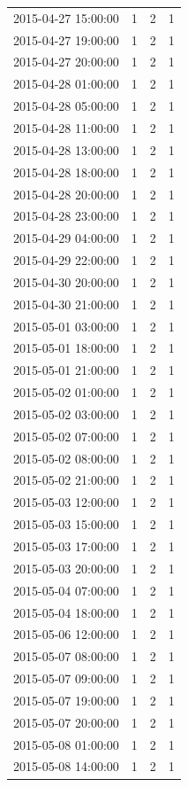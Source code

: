 \begin{tabular}{lrrr}
2015-04-27 15:00:00 & 1 & 2 & 1 \\
2015-04-27 19:00:00 & 1 & 2 & 1 \\
2015-04-27 20:00:00 & 1 & 2 & 1 \\
2015-04-28 01:00:00 & 1 & 2 & 1 \\
2015-04-28 05:00:00 & 1 & 2 & 1 \\
2015-04-28 11:00:00 & 1 & 2 & 1 \\
2015-04-28 13:00:00 & 1 & 2 & 1 \\
2015-04-28 18:00:00 & 1 & 2 & 1 \\
2015-04-28 20:00:00 & 1 & 2 & 1 \\
2015-04-28 23:00:00 & 1 & 2 & 1 \\
2015-04-29 04:00:00 & 1 & 2 & 1 \\
2015-04-29 22:00:00 & 1 & 2 & 1 \\
2015-04-30 20:00:00 & 1 & 2 & 1 \\
2015-04-30 21:00:00 & 1 & 2 & 1 \\
2015-05-01 03:00:00 & 1 & 2 & 1 \\
2015-05-01 18:00:00 & 1 & 2 & 1 \\
2015-05-01 21:00:00 & 1 & 2 & 1 \\
2015-05-02 01:00:00 & 1 & 2 & 1 \\
2015-05-02 03:00:00 & 1 & 2 & 1 \\
2015-05-02 07:00:00 & 1 & 2 & 1 \\
2015-05-02 08:00:00 & 1 & 2 & 1 \\
2015-05-02 21:00:00 & 1 & 2 & 1 \\
2015-05-03 12:00:00 & 1 & 2 & 1 \\
2015-05-03 15:00:00 & 1 & 2 & 1 \\
2015-05-03 17:00:00 & 1 & 2 & 1 \\
2015-05-03 20:00:00 & 1 & 2 & 1 \\
2015-05-04 07:00:00 & 1 & 2 & 1 \\
2015-05-04 18:00:00 & 1 & 2 & 1 \\
2015-05-06 12:00:00 & 1 & 2 & 1 \\
2015-05-07 08:00:00 & 1 & 2 & 1 \\
2015-05-07 09:00:00 & 1 & 2 & 1 \\
2015-05-07 19:00:00 & 1 & 2 & 1 \\
2015-05-07 20:00:00 & 1 & 2 & 1 \\
2015-05-08 01:00:00 & 1 & 2 & 1 \\
2015-05-08 14:00:00 & 1 & 2 & 1 \\

\end{tabular}
